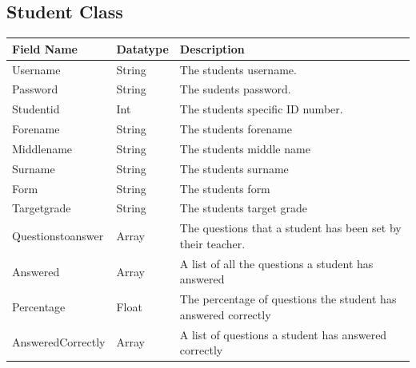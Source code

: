 \documentclass[a4paper,12pt]{report}
\begin{document}
\subsection{Student Class}

\begin{center}
\tablefirsthead{}
\tablehead{}
\tabletail{}
\tablelasttail{}
\begin{supertabular}{|m{1.8in}|m{1.22956in}|m{2.42956in}|}
\hline
Field Name &
Datatype &
Description\\\hline
Username &
String &
The students username.\\\hline
Password &
String &
The sudents password.\\\hline
Studentid &
Int &
The students specific ID number.\\\hline
Forename &
String &
The students forename\\\hline
Middlename &
String &
The students middle name\\\hline
Surname &
String &
The students surname \\\hline
Form &
String &
The students form \\\hline
Targetgrade &
String &
The students target grade\\\hline
Questionstoanswer &
Array &
The questions that a student has been set by their teacher.\\\hline
Answered &
Array &
A list of all the questions a student has answered\\\hline
Percentage &
Float &
The percentage of questions the student has answered correctly\\\hline
AnsweredCorrectly &
Array &
A list of questions a student has answered correctly\\\hline
\end{supertabular}
\end{center}
\end{document}
